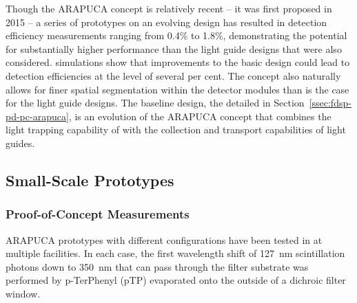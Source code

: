 Though the ARAPUCA concept is relatively recent -- it was first proposed in 2015 -- a series of prototypes on an evolving design has resulted in detection efficiency measurements ranging from  \num{0.4}\% to \num{1.8}\%, demonstrating the potential for substantially higher performance than the light guide designs that were also considered.  simulations show that %
improvements to the basic design could lead to detection efficiencies at the level of several per cent. 
The concept also naturally allows for finer spatial segmentation within the detector modules than is the case for the light guide designs. 
The baseline design, the  detailed in Section~\ref{ssec:fdsp-pd-pc-arapuca}, is an evolution of the ARAPUCA concept that combines the light trapping capability of  with the collection and transport capabilities of light guides. 


\subsection{Small-Scale  Prototypes}


\subsubsection{Proof-of-Concept Measurements}
\label{sec:proof-principle}

ARAPUCA prototypes with different configurations have been tested in \lar at multiple facilities. In each case, the first wavelength shift of \SI{127}{nm} scintillation photons down to \SI{350}{nm} that can pass through the filter substrate was performed by p-TerPhenyl (pTP) evaporated onto the outside of a dichroic filter window. 

